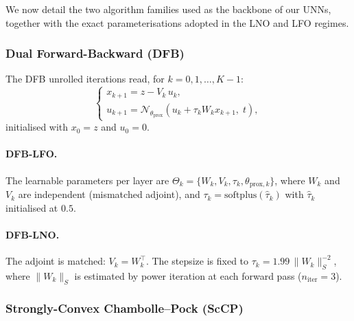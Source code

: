 \documentclass[a4paper,11pt]{article}
\theoremstyle{plain}{\theorembodyfont{\rmfamily}%
\newtheorem{proposition}[theorem]{Proposition}}
\theoremstyle{plain}{\theorembodyfont{\rmfamily}%
\newtheorem{notation}[theorem]{Notation}}
\theoremstyle{plain}{\theorembodyfont{\rmfamily}%
\newtheorem{assumption}[theorem]{Assumption}}
\theoremstyle{plain}{\theorembodyfont{\rmfamily}%
\newtheorem{problem}[theorem]{Problem}}
\theoremstyle{plain}{\theorembodyfont{\rmfamily}%
\newtheorem{example}[theorem]{Example}}
\theoremstyle{plain}{\theorembodyfont{\rmfamily}%
\newtheorem{remark}[theorem]{Remark}}
\theoremstyle{plain}{\theorembodyfont{\rmfamily}%
\newtheorem{definition}[theorem]{Definition}}
\theoremstyle{plain}{\theorembodyfont{\rmfamily}%
\newtheorem{question}[theorem]{Question}}
\numberwithin{equation}{section}
\begin{document}
We now detail the two algorithm families used as the backbone of our UNNs, together
with the exact parameterisations adopted in the LNO and LFO regimes.

\subsubsection{Dual Forward-Backward (DFB)}

The DFB unrolled iterations read, for $k = 0, 1, \ldots, K-1$:
\begin{equation}
\label{eq:dfb_iter}
    \begin{cases}
        x_{k+1} = z - V_k\, u_k, \\[4pt]
        u_{k+1} = \mathcal{N}_{\theta_{\text{prox}}}
            \!\left(u_k + \tau_k W_k x_{k+1},\; t\right),
    \end{cases}
\end{equation}
initialised with $x_0 = z$ and $u_0 = 0$.

\paragraph{DFB-LFO.} The learnable parameters per layer are
$\Theta_k = \{W_k, V_k, \tau_k, \theta_{\text{prox},k}\}$,
where $W_k$ and $V_k$ are independent (mismatched adjoint), and $\tau_k =
\mathrm{softplus}(\hat\tau_k)$ with $\hat\tau_k$ initialised at $0.5$.

\paragraph{DFB-LNO.} The adjoint is matched: $V_k = W_k^\top$. The stepsize is fixed
to $\tau_k = 1.99\,\|W_k\|_S^{-2}$, where $\|W_k\|_S$ is estimated by power
iteration at each forward pass ($n_{\text{iter}}=3$).

\subsubsection{Strongly-Convex Chambolle--Pock (ScCP)}
\end{document}
